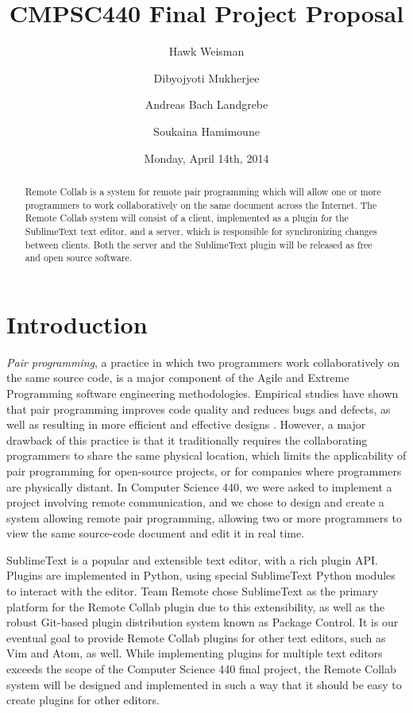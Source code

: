 \documentclass[11pt,english]{article}
\date{Monday, April 14th, 2014}
\title{CMPSC440 Final Project Proposal}
\author[1]{Hawk Weisman}
\author[1]{Dibyojyoti Mukherjee}
\author[1]{Andreas Bach Landgrebe}
\author[2]{Soukaina Hamimoune}
\affil[1]{Allegheny College, Department of Computer Science}
\affil[2]{Al Akhawayn University, Department of Computer Science}
\begin{document}
\maketitle
	\begin{abstract}
	Remote Collab is a system for remote pair programming which will allow one or more programmers to work collaboratively on the same document across the Internet. The Remote Collab system will consist of a client, implemented as a plugin for the SublimeText text editor, and a server, which is responsible for synchronizing changes between clients. Both the server and the SublimeText plugin will be released as free and open source software.
	\end{abstract}

\section{Introduction}
	\label{sec:intro}
	\textit{Pair programming}, a practice in which two programmers work collaboratively on the same source code, is a major component of the Agile and Extreme Programming software engineering methodologies. Empirical studies have shown that pair programming improves code quality and reduces bugs and defects, as well as resulting in more efficient and effective designs \cite{cockburn2000costs}. However, a major drawback of this practice is that it traditionally requires the collaborating programmers to share the same physical location, which limits the applicability of pair programming for open-source projects, or for companies where programmers are physically distant. In Computer Science 440, we were asked to implement a project involving remote communication, and we chose to design and create a system allowing remote pair programming, allowing two or more programmers to view the same source-code document and edit it in real time.

	SublimeText is a popular and extensible text editor, with a rich plugin API. Plugins are implemented in Python, using special SublimeText Python modules to interact with the editor. Team Remote chose SublimeText as the primary platform for the Remote Collab plugin due to this extensibility, as well as the robust Git-based plugin distribution system known as Package Control. It is our eventual goal to provide Remote Collab plugins for other text editors, such as Vim and Atom, as well. While implementing plugins for multiple text editors exceeds the scope of the Computer Science 440 final project, the Remote Collab system will be designed and implemented in such a way that it should be easy to create plugins for other editors.
\end{document}
